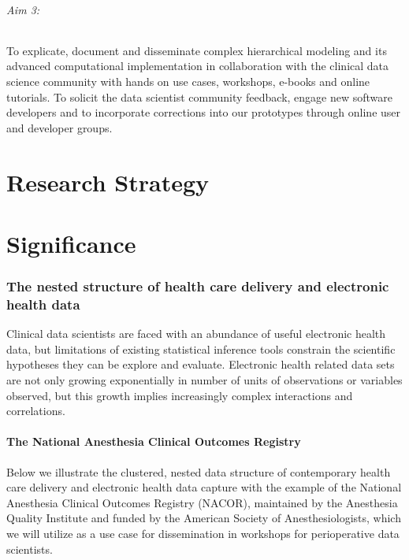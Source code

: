 \documentclass[11pt,notitlepage]{article}
\begin{document}
\paragraph*{Aim 3:} To explicate, document and disseminate complex hierarchical 
modeling and its advanced computational implementation in collaboration with the 
clinical data science community with hands on use cases, workshops, e-books and 
online tutorials. To solicit the data scientist community feedback, engage new 
software developers and to incorporate corrections into our prototypes through 
online user and developer groups.

\part*{Research Strategy}

\part*{Significance}

\section*{The nested structure of health care delivery and electronic health data}
Clinical data scientists are faced with an abundance of useful electronic health data, 
but limitations of existing statistical inference tools constrain the scientific 
hypotheses they can be explore and evaluate. Electronic health related data sets 
are not only growing exponentially in number of units of observations or 
variables observed, but this growth implies increasingly complex interactions 
and correlations.  

\subsection*{The National Anesthesia Clinical Outcomes Registry}
Below we illustrate the clustered, nested data structure of contemporary health 
care delivery and electronic health data capture with the example of the 
National Anesthesia Clinical Outcomes Registry (NACOR), maintained by the 
Anesthesia Quality Institute and funded by the American Society of 
Anesthesiologists, which we will utilize as a use case for dissemination in 
workshops for perioperative data scientists.
\end{document}
